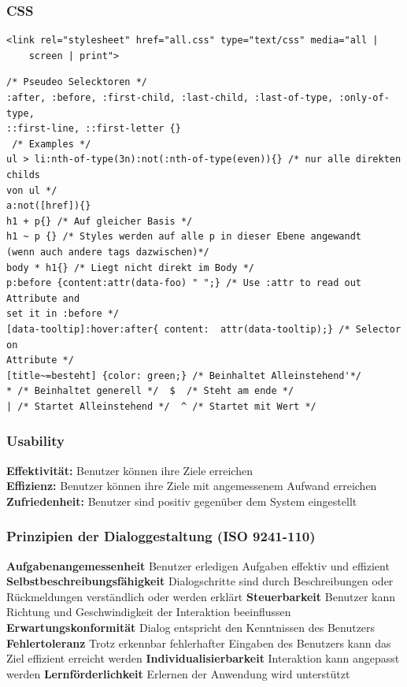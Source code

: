 \begin{multicols*}{4}
\subsubsection{CSS}
 \begin{verbatim}
<link rel="stylesheet" href="all.css" type="text/css" media="all | 
    screen | print">
 \end{verbatim}
 
\begin{verbatim}
/* Pseudeo Selecktoren */
:after, :before, :first-child, :last-child, :last-of-type, :only-of-type,
::first-line, ::first-letter {}
 /* Examples */
ul > li:nth-of-type(3n):not(:nth-of-type(even)){} /* nur alle direkten childs 
von ul */
a:not([href]){}
h1 + p{} /* Auf gleicher Basis */
h1 ~ p {} /* Styles werden auf alle p in dieser Ebene angewandt 
(wenn auch andere tags dazwischen)*/
body * h1{} /* Liegt nicht direkt im Body */
p:before {content:attr(data-foo) " ";} /* Use :attr to read out Attribute and 
set it in :before */
[data-tooltip]:hover:after{ content:  attr(data-tooltip);} /* Selector on 
Attribute */
[title~=besteht] {color: green;} /* Beinhaltet Alleinstehend'*/
* /* Beinhaltet generell */  $  /* Steht am ende */ 
| /* Startet Alleinstehend */  ^ /* Startet mit Wert */

\end{verbatim}

\subsubsection{Usability}
\textbf{ Effektivität:} Benutzer können ihre Ziele erreichen\\
\textbf{ Effizienz: }
Benutzer können ihre Ziele mit angemessenem Aufwand erreichen \\
\textbf{Zufriedenheit:}
Benutzer sind positiv gegenüber dem System eingestellt \\

\subsubsection{Prinzipien der Dialoggestaltung (ISO 9241-110)}

\textbf{Aufgabenangemessenheit}
Benutzer erledigen Aufgaben effektiv und effizient
\textbf{Selbstbeschreibungsfähigkeit}
Dialogschritte sind durch Beschreibungen oder Rückmeldungen verständlich oder werden erklärt
\textbf{Steuerbarkeit}
Benutzer kann Richtung und Geschwindigkeit der Interaktion beeinflussen
\textbf{Erwartungskonformität}
Dialog entspricht den Kenntnissen des Benutzers
\textbf{Fehlertoleranz}
Trotz erkennbar fehlerhafter Eingaben des Benutzers kann das Ziel effizient erreicht werden
\textbf{Individualisierbarkeit}
Interaktion kann angepasst werden
\textbf{Lernförderlichkeit}
Erlernen der Anwendung wird unterstützt

\end{multicols*}
